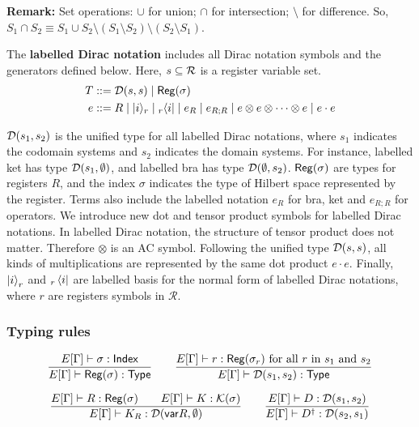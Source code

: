 \textbf{Remark: } Set operations: $\cup$ for union; $\cap$ for intersection; $\setminus$ for difference. So,
$ S_1 \cap S_2 \equiv S_1 \cup S_2 \setminus (S_1 \setminus S_2) \setminus (S_2 \setminus S_1) $.

\begin{definition}
  The \textbf{labelled Dirac notation} includes all Dirac notation symbols and the generators defined below.
  Here, $s\subseteq \mathcal{R}$ is a register variable set.
  \begin{align*}
    T & ::= \mathcal{D}(s,s) \mid \mathsf{Reg}(\sigma) \\
    e & ::= R \mid |i\rangle_r \mid {}_r\langle i| \mid e_R \mid e_{R;R} \mid
    e \otimes e \otimes \cdots \otimes e \mid e \cdot e \\
  \end{align*}
\end{definition}

$\mathcal{D}(s_1, s_2)$ is the unified type for all labelled Dirac notations, where $s_1$ indicates the codomain systems and $s_2$ indicates the domain systems. For instance, labelled ket has type $\mathcal{D}(s_1, \emptyset)$, and labelled bra has type $\mathcal{D}(\emptyset, s_2)$.
$\mathsf{Reg}(\sigma)$ are types for registers $R$, and the index $\sigma$ indicates the type of Hilbert space represented by the register.
Terms also include the labelled notation $e_R$ for bra, ket and $e_{R;R}$ for operators. We introduce new dot and tensor product symbols for labelled Dirac notations. In labelled Dirac notation, the structure of tensor product does not matter. Therefore $\otimes$ is an AC symbol.
Following the unified type $\mathcal{D}(s,s)$, all kinds of multiplications are represented by the same dot product $e \cdot e$.
Finally, $\ket{i}_r$ and ${}_r\bra{i}$ are labelled basis for the normal form of labelled Dirac notations, where $r$ are registers symbols in $\mathcal{R}$. 

\subsubsection*{Typing rules}

\[
    \frac{E[\Gamma] \vdash  \sigma : \mathsf{Index}}{E[\Gamma] \vdash \mathsf{Reg}(\sigma) : \mathsf{Type}}
    \qquad
    \frac{E[\Gamma] \vdash r : \mathsf{Reg}(\sigma_r) \text{ for all $r$ in $s_1$ and $s_2$} }{E[\Gamma] \vdash \mathcal{D}(s_1, s_2) : \textsf{Type}} 
\]

\[
    \frac{E[\Gamma] \vdash R : \mathsf{Reg}(\sigma)\qquad E[\Gamma] \vdash K : \mathcal{K}(\sigma)}{E[\Gamma] \vdash K_R : \mathcal{D}(\mathsf{var} R, \emptyset)}
    \qquad
    \frac{E[\Gamma] \vdash D : \mathcal{D}(s_1,s_2)}{E[\Gamma] \vdash D^\dagger : \mathcal{D}(s_2,s_1)}
\]

